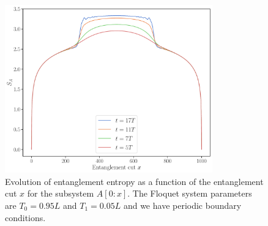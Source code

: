 \documentclass[11pt, a4paper]{article}
\theoremstyle{definition} %
\begin{document}
\begin{figure}[h]
	\centering
	\includegraphics[width=0.8\textwidth]{Entanglement_Entropy}
	\caption{Evolution of entanglement entropy as a function of the entanglement cut $x$ for the subsystem $A[0:x]$. The Floquet system parameters are $T_0 = 0.95L$ and $T_1=0.05L$ and we have periodic boundary conditions.}
\end{figure}
\end{document}

